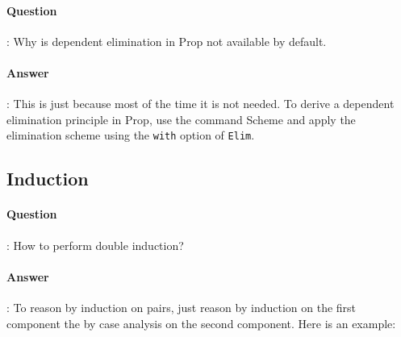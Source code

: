 \documentclass{article}
\begin{document}


\paragraph{Question}: Why is dependent elimination in Prop not
available by default.

\paragraph{Answer}: 
This is just because most of the time it is not needed. To derive a
dependent elimination principle in Prop, use the command Scheme and
apply the elimination scheme using the \verb=with= option of
\verb=Elim=.



\subsection{Induction}

\paragraph{Question}: How to perform double induction?

\paragraph{Answer}: To reason by induction on pairs, just reason by induction on the first component the by case analysis on the second component. Here is an example:
\end{document}
